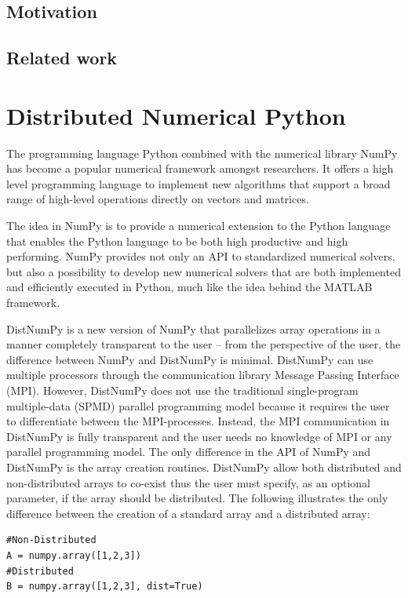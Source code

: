 \documentclass[preprint]{../PGAS10/sigplanconf}
\begin{document}
\subsection{Motivation}
\subsection{Related work}

\section{Distributed Numerical Python}
The programming language Python combined with the numerical library NumPy\cite{numpy} has become a popular numerical framework amongst researchers. It offers a high level programming language to implement new algorithms that support a broad range of high-level operations directly on vectors and matrices.

The idea in NumPy is to provide a numerical extension to the Python language that enables the Python language to be both high productive and high performing. NumPy provides not only an API to standardized numerical solvers, but also a possibility to develop new numerical solvers that are both implemented and efficiently executed in Python, much like the idea behind the MATLAB\cite{guide1998mathworks} framework. 

DistNumPy is a new version of NumPy that parallelizes array operations in a manner completely transparent to the user -- from the perspective of the user, the difference between NumPy and DistNumPy is minimal. DistNumPy can use multiple processors through the communication library Message Passing Interface (MPI)\cite{mpi}. However, DistNumPy does not use the traditional single-program multiple-data (SPMD) parallel programming model because it requires the user to differentiate between the MPI-processes. Instead, the MPI communication in DistNumPy is fully transparent and the user needs no knowledge of MPI or any parallel programming model. 
The only difference in the API of NumPy and DistNumPy is the array creation routines. DistNumPy allow both distributed and non-distributed arrays to co-exist thus the user must specify, as an optional parameter, if the array should be distributed. The following illustrates the only difference between the creation of a standard array and a distributed array:
\lstset{frame=none, xleftmargin=0mm, numbers=none}
\begin{lstlisting}
#Non-Distributed
A = numpy.array([1,2,3])
#Distributed
B = numpy.array([1,2,3], dist=True)
\end{lstlisting}
\lstset{frame=single, xleftmargin=5mm, numbers=left}
\end{document}
